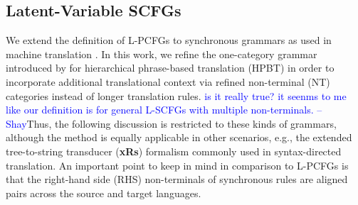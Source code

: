 \documentclass[11pt]{article}
\newcommand{\shaycomment}[1]{\textcolor{blue}{#1 -- Shay}}
\begin{document}
\subsection{Latent-Variable SCFGs}
\label{sec:formalism}
We extend the definition of L-PCFGs \cite{Matsuzaki2005,Petrov2006} to synchronous grammars as used in machine translation \cite{Galley2004,Chiang2005}. 
In this work, we refine the one-category grammar introduced by  for hierarchical phrase-based translation (HPBT) in order to incorporate additional translational context via refined non-terminal (NT) categories instead of longer translation rules.  
\shaycomment{is it really true? it seenms to me like our definition is for general L-SCFGs with multiple non-terminals.}Thus, the following discussion is restricted to these kinds of grammars, although the method is equally applicable in other scenarios, e.g., the extended tree-to-string transducer ({\bf xRs}) formalism \cite{Huang2006,Graehl2008} commonly used in syntax-directed translation.  
An important point to keep in mind in comparison to L-PCFGs is that the right-hand side (RHS) non-terminals of synchronous rules are aligned pairs across the source and target languages.  
\end{document}
